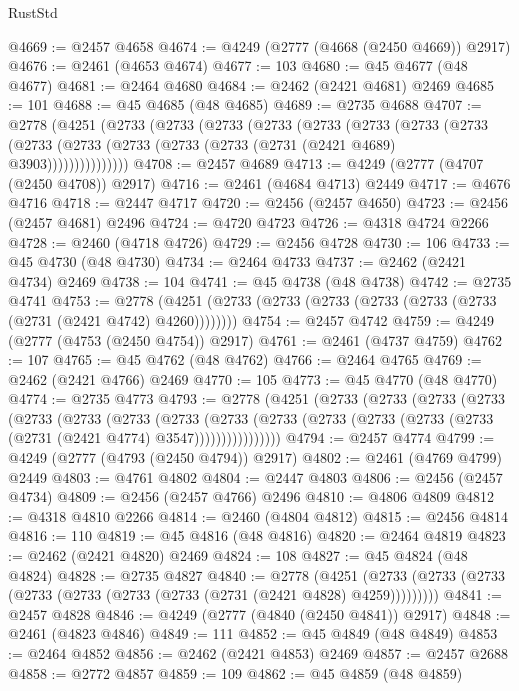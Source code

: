 \begin{lexlean}{RustStd}
\begin{coremodule}
@4669 := @2457 @4658
@4674 := @4249 (@2777 (@4668 (@2450 @4669)) @2917)
@4676 := @2461 (@4653 @4674)
@4677 := 103
@4680 := @45 @4677 (@48 @4677)
@4681 := @2464 @4680
@4684 := @2462 (@2421 @4681) @2469
@4685 := 101
@4688 := @45 @4685 (@48 @4685)
@4689 := @2735 @4688
@4707 := @2778
    (@4251
      (@2733
        (@2733
          (@2733
            (@2733
              (@2733
                (@2733
                  (@2733
                    (@2733
                      (@2733 (@2733 (@2733 (@2733 (@2733 (@2731 (@2421 @4689) @3903)))))))))))))))
@4708 := @2457 @4689
@4713 := @4249 (@2777 (@4707 (@2450 @4708)) @2917)
@4716 := @2461 (@4684 @4713) @2449
@4717 := @4676 @4716
@4718 := @2447 @4717
@4720 := @2456 (@2457 @4650)
@4723 := @2456 (@2457 @4681) @2496
@4724 := @4720 @4723
@4726 := @4318 @4724 @2266
@4728 := @2460 (@4718 @4726)
@4729 := @2456 @4728
@4730 := 106
@4733 := @45 @4730 (@48 @4730)
@4734 := @2464 @4733
@4737 := @2462 (@2421 @4734) @2469
@4738 := 104
@4741 := @45 @4738 (@48 @4738)
@4742 := @2735 @4741
@4753 := @2778 (@4251 (@2733 (@2733 (@2733 (@2733 (@2733 (@2733 (@2731 (@2421 @4742) @4260))))))))
@4754 := @2457 @4742
@4759 := @4249 (@2777 (@4753 (@2450 @4754)) @2917)
@4761 := @2461 (@4737 @4759)
@4762 := 107
@4765 := @45 @4762 (@48 @4762)
@4766 := @2464 @4765
@4769 := @2462 (@2421 @4766) @2469
@4770 := 105
@4773 := @45 @4770 (@48 @4770)
@4774 := @2735 @4773
@4793 := @2778
    (@4251
      (@2733
        (@2733
          (@2733
            (@2733
              (@2733
                (@2733
                  (@2733
                    (@2733
                      (@2733
                        (@2733
                          (@2733 (@2733 (@2733 (@2733 (@2731 (@2421 @4774) @3547))))))))))))))))
@4794 := @2457 @4774
@4799 := @4249 (@2777 (@4793 (@2450 @4794)) @2917)
@4802 := @2461 (@4769 @4799) @2449
@4803 := @4761 @4802
@4804 := @2447 @4803
@4806 := @2456 (@2457 @4734)
@4809 := @2456 (@2457 @4766) @2496
@4810 := @4806 @4809
@4812 := @4318 @4810 @2266
@4814 := @2460 (@4804 @4812)
@4815 := @2456 @4814
@4816 := 110
@4819 := @45 @4816 (@48 @4816)
@4820 := @2464 @4819
@4823 := @2462 (@2421 @4820) @2469
@4824 := 108
@4827 := @45 @4824 (@48 @4824)
@4828 := @2735 @4827
@4840 := @2778
    (@4251 (@2733 (@2733 (@2733 (@2733 (@2733 (@2733 (@2733 (@2731 (@2421 @4828) @4259)))))))))
@4841 := @2457 @4828
@4846 := @4249 (@2777 (@4840 (@2450 @4841)) @2917)
@4848 := @2461 (@4823 @4846)
@4849 := 111
@4852 := @45 @4849 (@48 @4849)
@4853 := @2464 @4852
@4856 := @2462 (@2421 @4853) @2469
@4857 := @2457 @2688
@4858 := @2772 @4857
@4859 := 109
@4862 := @45 @4859 (@48 @4859)

\end{coremodule}
\end{lexlean}
